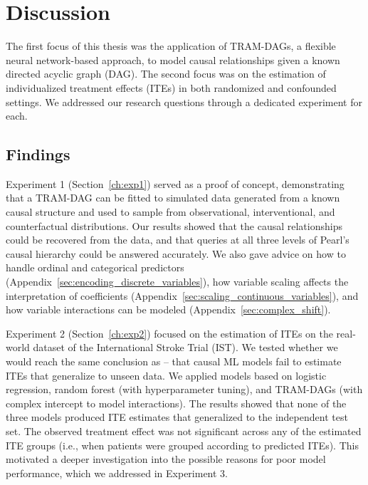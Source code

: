 



\chapter{Discussion}

The first focus of this thesis was the application of TRAM-DAGs, a flexible neural network-based approach, to model causal relationships given a known directed acyclic graph (DAG). The second focus was on the estimation of individualized treatment effects (ITEs) in both randomized and confounded settings. We addressed our research questions through a dedicated experiment for each.

\section{Findings}

\medskip

Experiment 1 (Section~\ref{ch:exp1}) served as a proof of concept, demonstrating that a TRAM-DAG can be fitted to simulated data generated from a known causal structure and used to sample from observational, interventional, and counterfactual distributions. Our results showed that the causal relationships could be recovered from the data, and that queries at all three levels of Pearl's causal hierarchy could be answered accurately. We also gave advice on how to handle ordinal and categorical predictors (Appendix~\ref{sec:encoding_discrete_variables}), how variable scaling affects the interpretation of coefficients (Appendix~\ref{sec:scaling_continuous_variables}), and how variable interactions can be modeled (Appendix~\ref{sec:complex_shift}).

\medskip

Experiment 2 (Section~\ref{ch:exp2}) focused on the estimation of ITEs on the real-world dataset of the International Stroke Trial (IST). We tested whether we would reach the same conclusion as \citet{chen2025} -- that causal ML models fail to estimate ITEs that generalize to unseen data. We applied models based on logistic regression, random forest (with hyperparameter tuning), and TRAM-DAGs (with complex intercept to model interactions). The results showed that none of the three models produced ITE estimates that generalized to the independent test set. The observed treatment effect was not significant across any of the estimated ITE groups (i.e., when patients were grouped according to predicted ITEs). This motivated a deeper investigation into the possible reasons for poor model performance, which we addressed in Experiment 3.

